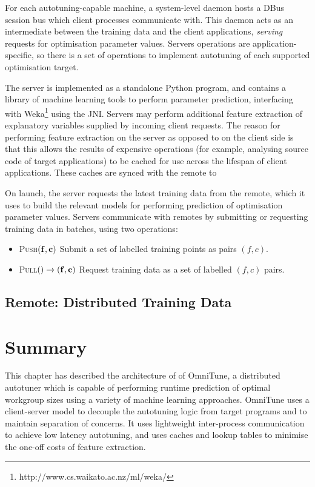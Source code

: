 For each autotuning-capable machine, a system-level daemon hosts a
DBus session bus which client processes communicate with. This daemon
acts as an intermediate between the training data and the client
applications, \emph{serving} requests for optimisation parameter
values. Servers operations are application-specific, so there is a set
of operations to implement autotuning of each supported optimisation
target.

The server is implemented as a standalone Python program, and contains
a library of machine learning tools to perform parameter prediction,
interfacing with Weka\footnote{http://www.cs.waikato.ac.nz/ml/weka/}
using the JNI. Servers may perform additional feature extraction of
explanatory variables supplied by incoming client requests. The reason
for performing feature extraction on the server as opposed to on the
client side is that this allows the results of expensive operations
(for example, analysing source code of target applications) to be
cached for use across the lifespan of client applications. These
caches are synced with the remote to

On launch, the server requests the latest training data from the
remote, which it uses to build the relevant models for performing
prediction of optimisation parameter values. Servers communicate with
remotes by submitting or requesting training data in batches, using
two operations:

\begin{itemize}
\item \textsc{Push}$(\bf{f}, \bf{c})$ Submit a set of labelled training
  points as pairs $(f,c)$.
\item \textsc{Pull}$() \to (\bf{f}, \bf{c})$ Request training data as a
  set of labelled $(f,c)$ pairs.
\end{itemize}


\subsection{Remote: Distributed Training Data}

\TODO{\ldots}


\section{Summary}

This chapter has described the architecture of of OmniTune, a
distributed autotuner which is capable of performing runtime
prediction of optimal workgroup sizes using a variety of machine
learning approaches. OmniTune uses a client-server model to decouple
the autotuning logic from target programs and to maintain separation
of concerns. It uses lightweight inter-process communication to
achieve low latency autotuning, and uses caches and lookup tables to
minimise the one-off costs of feature extraction.
